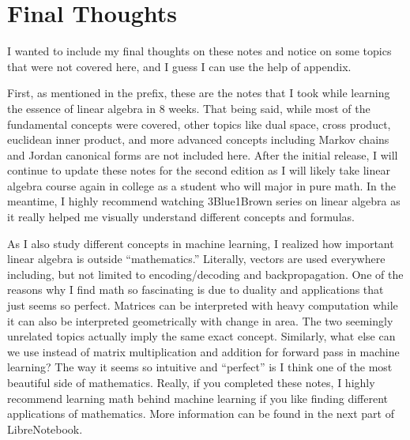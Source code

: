 \documentclass[../../../main.tex]{subfiles}
\begin{document}
\section{Final Thoughts}

I wanted to include my final thoughts on these notes and notice on
some topics that were not covered here, and I guess I can use the
help of appendix.

First, as mentioned in the prefix, these are the notes that I took
while learning the essence of linear algebra in 8 weeks. That being
said, while most of the fundamental concepts were covered, other
topics like dual space, cross product, euclidean inner product,
and more advanced concepts including Markov chains and Jordan
canonical forms are not included here. After the initial release,
I will continue to update these notes for the second edition as I will
likely take linear algebra course again in college as a student who
will major in pure math. In the meantime, I highly recommend watching
3Blue1Brown series on linear algebra as it really helped me visually
understand different concepts and formulas.

As I also study different concepts in machine learning, I realized
how important linear algebra is outside ``mathematics.'' Literally,
vectors are used everywhere including, but not limited to
encoding/decoding and backpropagation. One of the reasons why I
find math so fascinating is due to duality and applications that
just seems so perfect. Matrices can be interpreted with heavy
computation while it can also be interpreted geometrically with
change in area. The two seemingly unrelated topics actually imply
the same exact concept. Similarly, what else can we use instead of
matrix multiplication and addition for forward pass in machine
learning? The way it seems so intuitive and ``perfect'' is I think one
of the most beautiful side of mathematics. Really, if you completed
these notes, I highly recommend learning math behind machine learning
if you like finding different applications of mathematics. More
information can be found in the next part of LibreNotebook.
\end{document}
